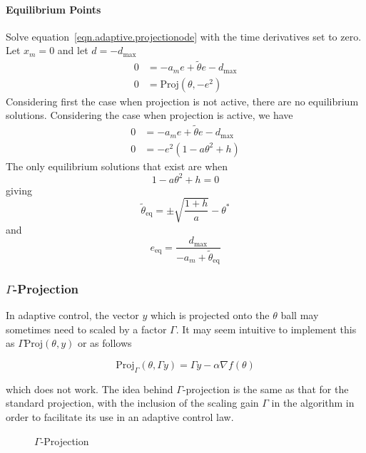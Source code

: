 \paragraph{Equilibrium Points}
Solve equation~\eqref{eqn.adaptive.projectionode} with the time derivatives set to zero.
Let $x_{m}=0$ and let $d=-d_{\text{max}}$
\begin{align*}
  0&=-a_{m}e+\tilde{\theta}e-d_{\text{max}} \\
  0&=\text{Proj}(\theta,-e^{2})
\end{align*}
Considering first the case when projection is not active, there are no equilibrium solutions.
Considering the case when projection is active, we have
\begin{align*}
  0&=-a_{m}e+\tilde{\theta}e-d_{\text{max}} \\
  0&=-e^{2}(1-a\theta^{2}+h)
\end{align*}
The only equilibrium solutions that exist are when
\begin{equation*}
  1-a\theta^{2}+h=0
\end{equation*}
giving
\begin{equation*}
  \tilde{\theta}_{\text{eq}}=\pm\sqrt{\frac{1+h}{a}}-\theta^{*}
\end{equation*}
and
\begin{equation*}
  e_{\text{eq}}=\frac{d_{\text{max}}}{-a_{m}+\tilde{\theta}_{\text{eq}}}
\end{equation*}

\subsubsection{$\Gamma$-Projection}

In adaptive control, the vector $y$ which is projected onto the $\theta$ ball may sometimes need to scaled by a factor $\Gamma$.
It may seem intuitive to implement this as $\Gamma\text{Proj}(\theta,y)$ or as follows

\begin{equation*}
  \text{Proj}_{\Gamma}(\theta,\Gamma y)=\Gamma y-\alpha\nabla f(\theta)
\end{equation*}

which does not work.
The idea behind $\Gamma$-projection is the same as that for the standard projection, with the inclusion of the scaling gain $\Gamma$ in the algorithm in order to facilitate its use in an adaptive control law.

\begin{figure}[H]
  \begin{center}
    \caption{$\Gamma$-Projection}
  \end{center}
\end{figure}

